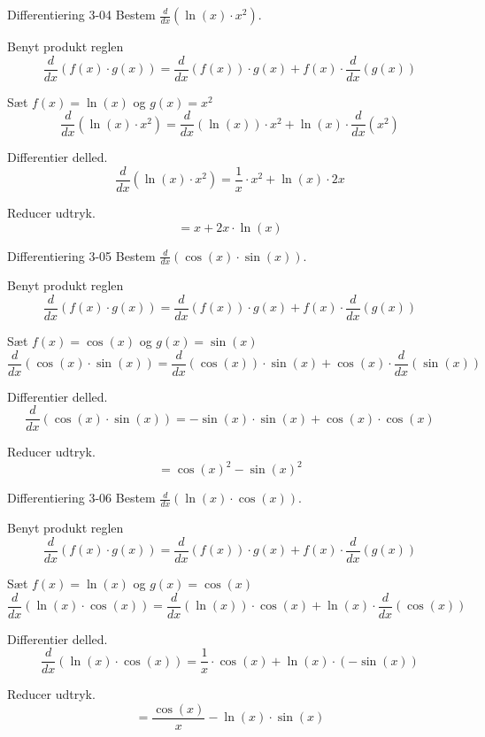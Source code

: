 \documentclass{article}
\begin{document}
\begin{exercise}{Differentiering 3-04}
Bestem $\frac{d}{dx} \left( \ln(x) \cdot x^2 \right)$.


\hint
Benyt produkt reglen
\[
\frac{d}{dx} \left( f(x) \cdot g(x) \right) = \frac{d}{dx} \left( f(x) \right) \cdot g(x) + f(x) \cdot \frac{d}{dx} \left( g(x) \right)
\]

\hint
Sæt $f(x) = \ln(x)$ og $g(x) = x^2$
\[
\frac{d}{dx} \left( \ln(x) \cdot x^2 \right) = \frac{d}{dx} \left( \ln(x) \right) \cdot x^2 + \ln(x) \cdot \frac{d}{dx} \left( x^2 \right)
\]

\hint
Differentier delled.
\[
\frac{d}{dx} \left( \ln(x) \cdot x^2 \right) = \frac{1}{x} \cdot x^2 + \ln(x) \cdot 2x
\]

\hint
Reducer udtryk.
\[
= x + 2x \cdot \ln(x)
\]
\end{exercise}


\begin{exercise}{Differentiering 3-05}
Bestem $\frac{d}{dx} \left( \cos(x) \cdot \sin(x) \right)$.


\hint
Benyt produkt reglen
\[
\frac{d}{dx} \left( f(x) \cdot g(x) \right) = \frac{d}{dx} \left( f(x) \right) \cdot g(x) + f(x) \cdot \frac{d}{dx} \left( g(x) \right)
\]

\hint
Sæt $f(x) = \cos(x)$ og $g(x) = \sin(x)$
\[
\frac{d}{dx} \left( \cos(x) \cdot \sin(x) \right) = \frac{d}{dx} \left( \cos(x) \right) \cdot \sin(x) + \cos(x) \cdot \frac{d}{dx} \left( \sin(x) \right)
\]

\hint
Differentier delled.
\[
\frac{d}{dx} \left( \cos(x) \cdot \sin(x) \right) = - \sin(x) \cdot \sin(x) + \cos(x) \cdot \cos(x)
\]

\hint
Reducer udtryk.
\[
= \cos(x)^2 - \sin(x)^2
\]


\end{exercise}


\begin{exercise}{Differentiering 3-06}
Bestem $\frac{d}{dx} \left( \ln(x) \cdot \cos(x) \right)$.


\hint
Benyt produkt reglen
\[
\frac{d}{dx} \left( f(x) \cdot g(x) \right) = \frac{d}{dx} \left( f(x) \right) \cdot g(x) + f(x) \cdot \frac{d}{dx} \left( g(x) \right)
\]

\hint
Sæt $f(x) = \ln(x)$ og $g(x) = \cos(x)$
\[
\frac{d}{dx} \left( \ln(x) \cdot \cos(x) \right) = \frac{d}{dx} \left( \ln(x) \right) \cdot \cos(x) + \ln(x) \cdot \frac{d}{dx} \left( \cos(x) \right)
\]

\hint
Differentier delled.
\[
\frac{d}{dx} \left( \ln(x) \cdot \cos(x) \right) = \frac{1}{x} \cdot \cos(x) + \ln(x) \cdot(- \sin(x) )
\]

\hint
Reducer udtryk.
\[
= \frac{\cos(x)}{x} - \ln(x) \cdot \sin(x)
\]

\end{exercise}
\end{document}
